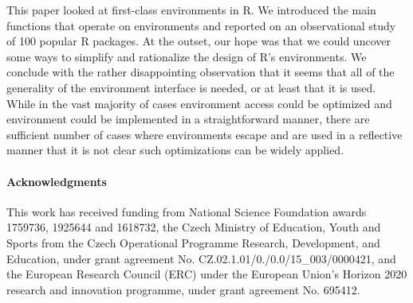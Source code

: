 \documentclass[10pt,review,sigplan,authorversion=true]{acmart}
\begin{document}
This paper looked at first-class environments in R. We introduced the main
functions that operate on environments and reported on an observational study of
100 popular R packages. At the outset, our hope was that we could uncover some
ways to simplify and rationalize the design of R's environments. We conclude
with the rather disappointing observation that it seems that all of the
generality of the environment interface is needed, or at least that it is used.
While in the vast majority of cases environment access could be optimized and
environment could be implemented in a straightforward manner, there are
sufficient number of cases where environments escape and are used in a
reflective manner that it is not clear such optimizations can be widely applied.


\paragraph{Acknowledgments}
This work has received funding from National Science Foundation awards 1759736,
1925644 and 1618732, the Czech Ministry of Education, Youth and Sports from the
Czech Operational Programme Research, Development, and Education, under grant
agreement No. CZ.02.1.01/0./0.0/15\_003/0000421, and the European Research
Council (ERC) under the European Union’s Horizon 2020 research and innovation
programme, under grant agreement No. 695412.


\end{document}
